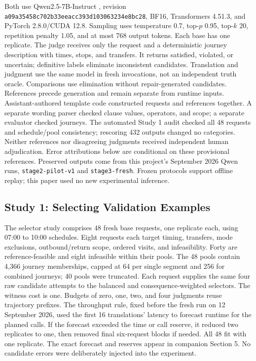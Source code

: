 \documentclass[a4paper,twoside]{article}
\begin{document}
Both use Qwen2.5-7B-Instruct \cite{qwen}, revision \texttt{a09a35458c702b33eeac\allowbreak{}c393d103063234e8bc28}, BF16, Transformers 4.51.3, and PyTorch 2.8.0/CUDA 12.8. Sampling uses temperature 0.7, top-$p$ 0.95, top-$k$ 20, repetition penalty 1.05, and at most 768 output tokens. Each base has one replicate.
The judge receives only the request and a deterministic journey description with times, stops, and transfers. It returns satisfied, violated, or uncertain; definitive labels eliminate inconsistent candidates. Translation and judgment use the same model in fresh invocations, not an independent truth oracle. Comparisons use elimination without repair-generated candidates.
References precede generation and remain separate from runtime inputs. Assistant-authored template code constructed requests and references together. A separate wording parser checked clause values, operators, and scope; a separate evaluator checked journeys. The automated Study 1 audit checked all 48 requests and schedule/pool consistency; rescoring 432 outputs changed no categories. Neither references nor disagreeing judgments received independent human adjudication. Error attributions below are conditional on these provisional references.
Preserved outputs come from this project's September 2026 Qwen runs, \texttt{stage2-pilot-v1} and \texttt{stage3-fresh}. Frozen protocols support offline replay; this paper used no new experimental inference.

\subsection{Study 1: Selecting Validation Examples}

The selector study comprises 48 fresh base requests, one replicate each, using 07:00 to 10:00 schedules. Eight requests each target timing, transfers, mode exclusions, outbound/return scope, ordered visits, and infeasibility. Forty are reference-feasible and eight infeasible within their pools. The 48 pools contain 4,366 journey memberships, capped at 64 per single segment and 256 for combined journeys; 40 pools were truncated.
Each request supplies the same four raw candidate attempts to the balanced and consequence-weighted selectors. The witness cost is one. Budgets of zero, one, two, and four judgments reuse trajectory prefixes. The throughput rule, fixed before the fresh run on 12 September 2026, used the first 16 translations' latency to forecast runtime for the planned calls. If the forecast exceeded the time or call reserve, it reduced two replicates to one, then removed final six-request blocks if needed. All 48 fit with one replicate. The exact forecast and reserves appear in companion Section 5. No candidate errors were deliberately injected into the experiment.
\end{document}
